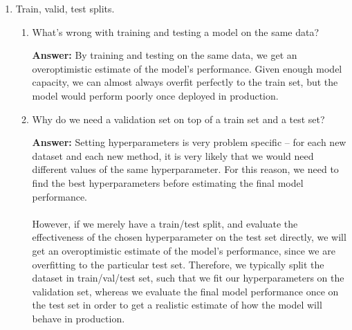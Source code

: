 \documentclass{article}
\newenvironment{QandA}{\begin{enumerate}[label=\arabic*.]}{\end{enumerate}}
\newenvironment{InnerQandA}{\begin{enumerate}[label=\roman*.]}{\end{enumerate}}
\newenvironment{answer}{\par\normalfont \textbf{Answer:}}{}
\begin{document}
\begin{QandA}
\begin{InnerQandA}
\begin{answer}
            (Source: \href{https://en.wikipedia.org/wiki/Cross-validation_(statistics)}{Wikipedia}, \href{https://www.upgrad.com/blog/cross-validation-in-machine-learning/}{Upgrad})
        \end{answer}

        \item Why don’t we see more cross-validation in deep learning?
        \begin{answer}
            With large datasets, it's very computationally expensive to perform K-fold / Leave-P-Out cross validation. These types of cross validation are most useful when the dataset is on the order of hundreds of examples. Therefore, in practice people usually perform the holdout method by splitting the dataset into train/val/test. 

            (Source: Yours truly, \href{https://www.quora.com/Is-cross-validation-heavily-used-in-deep-learning-or-is-it-too-expensive-to-be-used}{Yoshua Bengio})
        \end{answer}
    \end{InnerQandA}

    \item Train, valid, test splits.
    \begin{InnerQandA}
        \item What’s wrong with training and testing a model on the same data?
        \begin{answer}
            By training and testing on the same data, we get an overoptimistic estimate of the model's performance. Given enough model capacity, we can almost always overfit perfectly to the train set, but the model would perform poorly once deployed in production. 
        \end{answer}

        \item Why do we need a validation set on top of a train set and a test set?
        \begin{answer}
            Setting hyperparameters is very problem specific -- for each new dataset and each new method, it is very likely that we would need different values of the same hyperparameter. For this reason, we need to find the best hyperparameters before estimating the final model performance.\\\\
            However, if we merely have a train/test split, and evaluate the effectiveness of the chosen hyperparameter on the test set directly, we will get an overoptimistic estimate of the model's performance, since we are overfitting to the particular test set. Therefore, we typically split the dataset in train/val/test set, such that we fit our hyperparameters on the validation set, whereas we evaluate the final model performance once on the test set in order to get a realistic estimate of how the model will behave in production. 
        \end{answer}


\end{InnerQandA}
\end{QandA}
\end{document}
